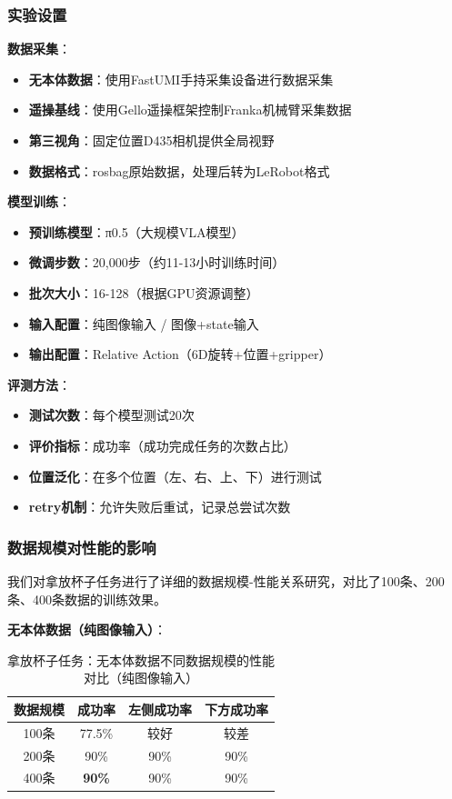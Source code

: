 \subsubsection{实验设置}

\textbf{数据采集}：
\begin{itemize}[leftmargin=2em]
    \item \textbf{无本体数据}：使用FastUMI手持采集设备进行数据采集
    \item \textbf{遥操基线}：使用Gello遥操框架控制Franka机械臂采集数据
    \item \textbf{第三视角}：固定位置D435相机提供全局视野
    \item \textbf{数据格式}：rosbag原始数据，处理后转为LeRobot格式
\end{itemize}

\textbf{模型训练}：
\begin{itemize}[leftmargin=2em]
    \item \textbf{预训练模型}：π0.5（大规模VLA模型）
    \item \textbf{微调步数}：20,000步（约11-13小时训练时间）
    \item \textbf{批次大小}：16-128（根据GPU资源调整）
    \item \textbf{输入配置}：纯图像输入 / 图像+state输入
    \item \textbf{输出配置}：Relative Action（6D旋转+位置+gripper）
\end{itemize}

\textbf{评测方法}：
\begin{itemize}[leftmargin=2em]
    \item \textbf{测试次数}：每个模型测试20次
    \item \textbf{评价指标}：成功率（成功完成任务的次数占比）
    \item \textbf{位置泛化}：在多个位置（左、右、上、下）进行测试
    \item \textbf{ retry机制}：允许失败后重试，记录总尝试次数
\end{itemize}

\subsubsection{数据规模对性能的影响}

我们对拿放杯子任务进行了详细的数据规模-性能关系研究，对比了100条、200条、400条数据的训练效果。

\textbf{无本体数据（纯图像输入）}：

\begin{table}[htbp]
\centering
\caption{拿放杯子任务：无本体数据不同数据规模的性能对比（纯图像输入）}
\label{tab:data_scale_cup_embodiment_free}
\begin{tabular}{cccc}
\toprule
数据规模 & 成功率 & 左侧成功率 & 下方成功率 \\
\midrule
100条 & 77.5\% & 较好 & 较差 \\
200条 & 90\% & 90\% & 90\% \\
400条 & \textbf{90\%} & 90\% & 90\% \\
\bottomrule
\end{tabular}
\end{table}


